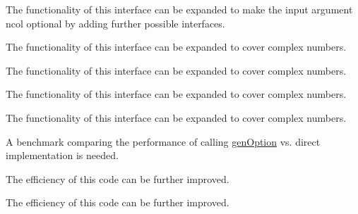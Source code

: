 \begin{DoxyRefList}
%
 The functionality of this interface can be expanded to make the input argument {\ttfamily ncol} optional by adding further possible interfaces. 
\item[Type \mbox{\hyperlink{interfaceMatrixSymmetry__mod_1_1genMatSymFromMatLow}{Matrix\+Symmetry\+\_\+mod\+::gen\+Mat\+Sym\+From\+Mat\+Low}} ]\label{todo__todo000062}%
%
 The functionality of this interface can be expanded to cover complex numbers. 
\item[Type \mbox{\hyperlink{interfaceMatrixSymmetry__mod_1_1genMatSymFromMatUpp}{Matrix\+Symmetry\+\_\+mod\+::gen\+Mat\+Sym\+From\+Mat\+Upp}} ]\label{todo__todo000061}%
%
 The functionality of this interface can be expanded to cover complex numbers. 
\item[Type \mbox{\hyperlink{interfaceMatrixSymmetry__mod_1_1symmetrizeMatLow}{Matrix\+Symmetry\+\_\+mod\+::symmetrize\+Mat\+Low}} ]\label{todo__todo000060}%
%
 The functionality of this interface can be expanded to cover complex numbers. 
\item[Type \mbox{\hyperlink{interfaceMatrixSymmetry__mod_1_1symmetrizeMatUpp}{Matrix\+Symmetry\+\_\+mod\+::symmetrize\+Mat\+Upp}} ]\label{todo__todo000059}%
%
 The functionality of this interface can be expanded to cover complex numbers. 
\item[Type \mbox{\hyperlink{interfaceOption__mod_1_1genOption}{Option\+\_\+mod\+::gen\+Option}} ]\label{todo__todo000063}%
%
 A benchmark comparing the performance of calling \mbox{\hyperlink{interfaceOption__mod_1_1genOption}{gen\+Option}} vs. direct implementation is needed. 
\item[Subprogram \mbox{\hyperlink{namespaceSample__mod_af9dafbc79f11fc37f384877e49f3bf27}{Sample\+\_\+mod\+::get\+Cho\+Low\+Cov\+Upp}} (nd, np, Mean, Sample, Cho\+Low\+Cov\+Upp, Cho\+Dia)]\label{todo__todo000067}%
%
 The efficiency of this code can be further improved. 
\item[Subprogram \mbox{\hyperlink{namespaceSample__mod_a1e5daab49859d9c21c4ec3c916ec963d}{Sample\+\_\+mod\+::get\+Cho\+Low\+Cov\+Upp\+High\+Dim}} (nd, np, Mean, Sample, Cho\+Low\+Cov\+Upp, Cho\+Dia)]\label{todo__todo000068}%
%
 The efficiency of this code can be further improved. 
\item[Subprogram \mbox{\hyperlink{namespaceSample__mod_ab6c8a951bf35c59402a30d6d17a6d193}{Sample\+\_\+mod\+::merge\+Mean\+Cov\+Upp}} (nd, npA, MeanA, Cov\+UppA, npB, MeanB, Cov\+UppB, Mean\+AB, Cov\+Upp\+AB)]\label{todo__todo000069}%

\end{DoxyRefList}
